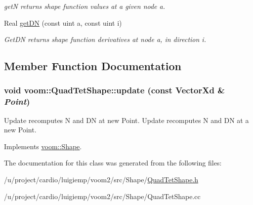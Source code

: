 \begin{DoxyCompactItemize}
\begin{DoxyCompactList}\small\item\em getN returns shape function values at a given node a. \item\end{DoxyCompactList}\item 
\hypertarget{classvoom_1_1_quad_tet_shape_a61a6d7d67989036ca050059077792928}{
Real \hyperlink{classvoom_1_1_quad_tet_shape_a61a6d7d67989036ca050059077792928}{getDN} (const uint a, const uint i)}
\label{classvoom_1_1_quad_tet_shape_a61a6d7d67989036ca050059077792928}

\begin{DoxyCompactList}\small\item\em GetDN returns shape function derivatives at node a, in direction i. \item\end{DoxyCompactList}\end{DoxyCompactItemize}


\subsection{Member Function Documentation}
\hypertarget{classvoom_1_1_quad_tet_shape_a299d2a86a8444228197fa93fae54d45e}{
\subsubsection[{update}]{\setlength{\rightskip}{0pt plus 5cm}void voom::QuadTetShape::update (const VectorXd \& {\em Point})}}
\label{classvoom_1_1_quad_tet_shape_a299d2a86a8444228197fa93fae54d45e}


Update recomputes N and DN at new Point. Update recomputes N and DN at a new Point. 

Implements \hyperlink{classvoom_1_1_shape_a8ded544de12647543b056cec61be9f26}{voom::Shape}.

The documentation for this class was generated from the following files:\begin{DoxyCompactItemize}
\item 
/u/project/cardio/luigiemp/voom2/src/Shape/\hyperlink{_quad_tet_shape_8h}{QuadTetShape.h}\item 
/u/project/cardio/luigiemp/voom2/src/Shape/QuadTetShape.cc\end{DoxyCompactItemize}

